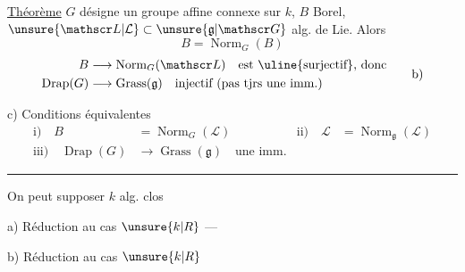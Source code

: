 \uline{Théorème} $G$ désigne un groupe affine connexe sur $k$, $B$ Borel, $\unsure{\mathscr L|\mathcal L}\subset\unsure{\mathfrak g|\mathscr G}$ alg. de Lie. Alors
\[
B=\operatorname{Norm}_{G}(B)\tag*{a)}
\]
\[
\begin{aligned}
B&\longrightarrow\operatorname{Norm}_{G}(\mathscr L)\quad\text{est \uline{surjectif}, donc}\\
\operatorname{Drap}(G)&\longrightarrow\operatorname{Grass}(\mathfrak g)\quad\text{injectif (pas tjrs une imm.)}
\end{aligned}
\tag*{b)}
\]

 c) Conditions équivalentes
\[
\begin{aligned}
\text{i)}\quad B&=\operatorname{Norm}_{G}(\mathscr L)
&\text{ii)}\quad\mathscr L&=\operatorname{Norm}_{\mathfrak g}(\mathscr L)\\
\text{iii)}\quad\operatorname{Drap}(G)&\longrightarrow\operatorname{Grass}(\mathfrak g)\quad\text{une imm.}
\end{aligned}
\]
\smallskip\hrule\smallskip
On peut supposer $k$ alg. clos

 a) Réduction au cas $\unsure{k|R}$  ---

 b)  Réduction au cas $\unsure{k|R}$   

